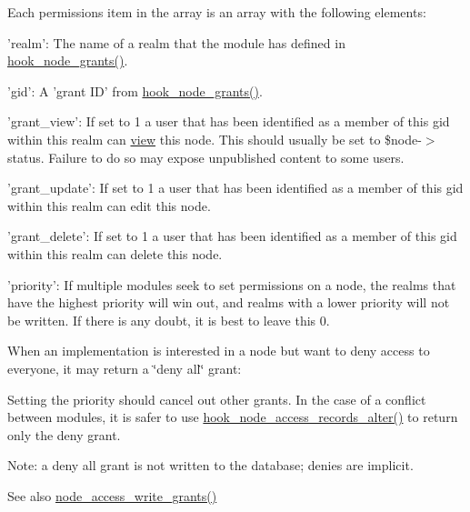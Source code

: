 Each permissions item in the array is an array with the following elements:
\begin{DoxyItemize}
\item 'realm': The name of a realm that the module has defined in \hyperlink{group__node__access_gaa973f2ab6ab14c3fa14e5138c6d69ecf}{hook\_\-node\_\-grants()}.
\item 'gid': A 'grant ID' from \hyperlink{group__node__access_gaa973f2ab6ab14c3fa14e5138c6d69ecf}{hook\_\-node\_\-grants()}.
\item 'grant\_\-view': If set to 1 a user that has been identified as a member of this gid within this realm can \hyperlink{classview}{view} this node. This should usually be set to \$node-\/$>$status. Failure to do so may expose unpublished content to some users.
\item 'grant\_\-update': If set to 1 a user that has been identified as a member of this gid within this realm can edit this node.
\item 'grant\_\-delete': If set to 1 a user that has been identified as a member of this gid within this realm can delete this node.
\item 'priority': If multiple modules seek to set permissions on a node, the realms that have the highest priority will win out, and realms with a lower priority will not be written. If there is any doubt, it is best to leave this 0.
\end{DoxyItemize}

When an implementation is interested in a node but want to deny access to everyone, it may return a \char`\"{}deny all\char`\"{} grant:




Setting the priority should cancel out other grants. In the case of a conflict between modules, it is safer to use \hyperlink{group__node__access_ga37c90bf0e1dccad0deefa368dd94cc83}{hook\_\-node\_\-access\_\-records\_\-alter()} to return only the deny grant.

Note: a deny all grant is not written to the database; denies are implicit.

\begin{DoxySeeAlso}{See also}
\hyperlink{group__node__access_ga735fbb5dfa05cc1aed121655a1694909}{node\_\-access\_\-write\_\-grants()}
\end{DoxySeeAlso}

